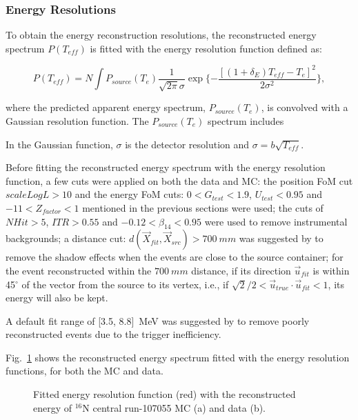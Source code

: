 \subsubsection{Energy Resolutions}

To obtain the energy reconstruction resolutions, the reconstructed energy spectrum $P(T_{eff})$ is fitted with the energy resolution function defined as\cite{waterunidoc}:

\begin{equation}
P(T_{eff})=N\int P_{source}(T_e)\frac{1}{\sqrt{2\pi}\sigma}\exp \{-\frac{[(1+\delta_E)T_{eff}-T_e]^2}{2\sigma^2}\},
\end{equation}

where the predicted apparent energy spectrum, $P_{source}(T_e)$, is convolved with a Gaussian resolution function. The $P_{source}(T_e)$ spectrum includes 

In the Gaussian function, $\sigma$ is the detector resolution and $\sigma = b\sqrt {T_{eff}}$.

Before fitting the reconstructed energy spectrum with the energy resolution function, a few cuts were applied on both the data and MC: the position FoM cut $scaleLogL>10$ and the energy FoM cuts: $0<G_{test}<1.9$, $U_{test}<0.95$ and $-11<Z_{factor}<1$ mentioned in the previous sections were used; the cuts of $NHit>5$, $ITR>0.55$ and $-0.12<\beta_{14}<0.95$ were used to remove instrumental backgrounds; a distance cut: $d(\vec{X}_{fit},\vec{X}_{src})>700~mm$ was suggested by \cite{leta,waterunidoc} to remove the shadow effects when the events are close to the source container; for the event reconstructed within the $700~mm$ distance, if its direction $\vec{u}_{fit}$ is within 45$^\circ$ of the vector from the source to its vertex, i.e., if $\sqrt2/2<\vec{u}_{true}\cdot \vec{u}_{fit}<1$, its energy will also be kept.

A default fit range of [3.5, 8.8]~MeV was suggested by \cite{waterunidoc} to remove poorly reconstructed events due to the trigger inefficiency.

Fig.~\ref{fittedEnergyResol} shows the reconstructed energy spectrum fitted with the energy resolution functions, for both the MC and data.
\begin{figure}
	\centering
	\caption{Fitted energy resolution function (red) with the reconstructed energy of $^{16}$N central run-107055 MC (a) and data (b).}
	\label{fittedEnergyResol}
\end{figure}


